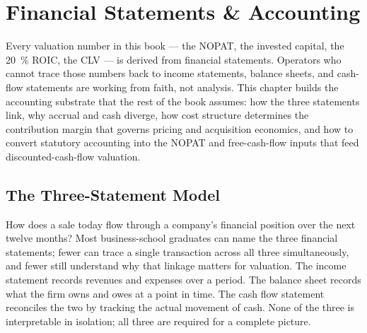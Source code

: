 \chapter{Financial Statements \& Accounting}\label{ch:financial-statements}


Every valuation number in this book --- the  NOPAT, the 
invested capital, the \qty{20}{\percent} ROIC, the  CLV --- is derived from
financial statements. Operators who cannot trace those numbers back to income statements,
balance sheets, and cash-flow statements are working from faith, not analysis. This chapter
builds the accounting substrate that the rest of the book assumes: how the three statements
link, why accrual and cash diverge, how cost structure determines the contribution margin
that governs pricing and acquisition economics, and how to convert statutory accounting into
the NOPAT and free-cash-flow inputs that feed discounted-cash-flow valuation.

\section{The Three-Statement Model}\label{sec:three-statements}

How does a sale today flow through a company's financial position over the next twelve
months? Most business-school graduates can name the three financial statements; fewer can
trace a single transaction across all three simultaneously, and fewer still understand why
that linkage matters for valuation. The income statement records revenues and expenses over
a period. The balance sheet records what the firm owns and owes at a point in time. The cash
flow statement reconciles the two by tracking the actual movement of cash. None of the three
is interpretable in isolation; all three are required for a complete picture.

